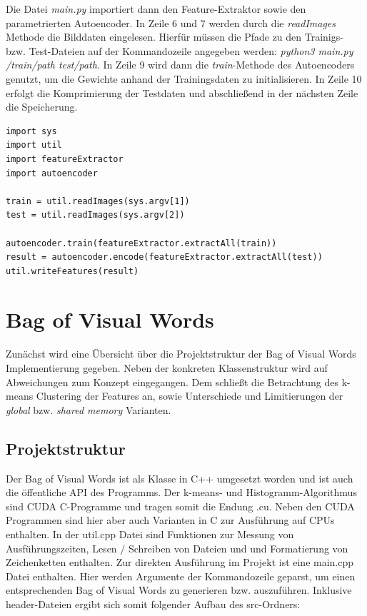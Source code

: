 
Die Datei \textit{main.py} importiert dann den Feature-Extraktor sowie den parametrierten Autoencoder. In Zeile 6 und 7 werden durch die \textit{readImages} Methode die Bilddaten eingelesen. Hierfür müssen die Pfade zu den Trainigs- bzw. Test-Dateien auf der Kommandozeile angegeben werden: \textit{python3 main.py /train/path test/path}. In Zeile 9 wird dann die \textit{train}-Methode des Autoencoders genutzt, um die Gewichte anhand der Trainingsdaten zu initialisieren. In Zeile 10 erfolgt die Komprimierung der Testdaten und abschließend in der nächsten Zeile die Speicherung.

\lstset{language=Python}
\begin{lstlisting}
import sys
import util
import featureExtractor
import autoencoder

train = util.readImages(sys.argv[1])
test = util.readImages(sys.argv[2])

autoencoder.train(featureExtractor.extractAll(train))
result = autoencoder.encode(featureExtractor.extractAll(test))
util.writeFeatures(result)
\end{lstlisting}

\section{Bag of Visual Words}

Zunächst wird eine Übersicht über die Projektstruktur der Bag of Visual Words Implementierung gegeben. Neben der konkreten Klassenstruktur wird auf Abweichungen zum Konzept eingegangen. Dem schließt die Betrachtung des k-means Clustering der Features an, sowie Unterschiede und Limitierungen der \textit{global} bzw. \textit{shared memory} Varianten.

\subsection{Projektstruktur}

Der Bag of Visual Words ist als Klasse in C++ umgesetzt worden und ist auch die öffentliche API des Programms. Der k-means- und Histogramm-Algorithmus sind CUDA C-Programme und tragen somit die Endung .cu. Neben den CUDA Programmen sind hier aber auch Varianten in C zur Ausführung auf CPUs enthalten. In der util.cpp Datei sind Funktionen zur Messung von Ausführungszeiten, Lesen / Schreiben von Dateien und und Formatierung von Zeichenketten enthalten. Zur direkten Ausführung im Projekt ist eine main.cpp Datei enthalten. Hier werden Argumente der Kommandozeile geparst, um einen entsprechenden Bag of Visual Words zu generieren bzw. auszuführen. Inklusive header-Dateien ergibt sich somit folgender Aufbau des src-Ordners:

